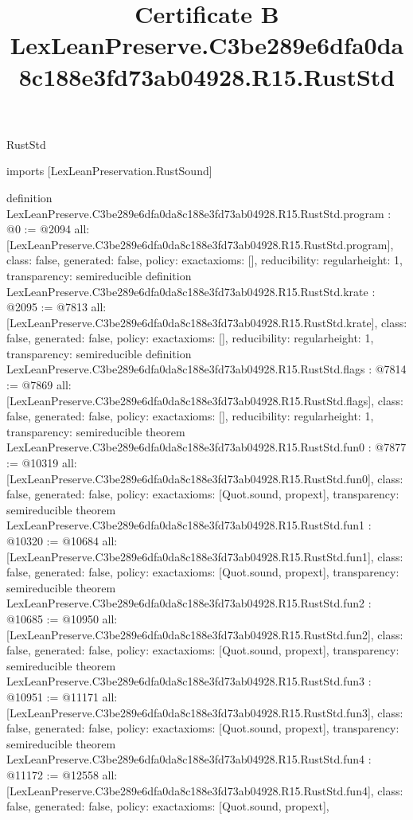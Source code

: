 \begin{lexlean}{RustStd}
\title{Certificate B LexLeanPreserve.C3be289e6dfa0da8c188e3fd73ab04928.R15.RustStd}
\begin{coremodule}
imports [LexLeanPreservation.RustSound]

definition LexLeanPreserve.C3be289e6dfa0da8c188e3fd73ab04928.R15.RustStd.program : @0 := @2094 {
  all: [LexLeanPreserve.C3be289e6dfa0da8c188e3fd73ab04928.R15.RustStd.program],
  class: false,
  generated: false,
  policy: exact{axioms: []},
  reducibility: regular{height: 1},
  transparency: semireducible
}
definition LexLeanPreserve.C3be289e6dfa0da8c188e3fd73ab04928.R15.RustStd.krate : @2095 := @7813 {
  all: [LexLeanPreserve.C3be289e6dfa0da8c188e3fd73ab04928.R15.RustStd.krate],
  class: false,
  generated: false,
  policy: exact{axioms: []},
  reducibility: regular{height: 1},
  transparency: semireducible
}
definition LexLeanPreserve.C3be289e6dfa0da8c188e3fd73ab04928.R15.RustStd.flags : @7814 := @7869 {
  all: [LexLeanPreserve.C3be289e6dfa0da8c188e3fd73ab04928.R15.RustStd.flags],
  class: false,
  generated: false,
  policy: exact{axioms: []},
  reducibility: regular{height: 1},
  transparency: semireducible
}
theorem LexLeanPreserve.C3be289e6dfa0da8c188e3fd73ab04928.R15.RustStd.fun0 : @7877 := @10319 {
  all: [LexLeanPreserve.C3be289e6dfa0da8c188e3fd73ab04928.R15.RustStd.fun0],
  class: false,
  generated: false,
  policy: exact{axioms: [Quot.sound, propext]},
  transparency: semireducible
}
theorem LexLeanPreserve.C3be289e6dfa0da8c188e3fd73ab04928.R15.RustStd.fun1 : @10320 := @10684 {
  all: [LexLeanPreserve.C3be289e6dfa0da8c188e3fd73ab04928.R15.RustStd.fun1],
  class: false,
  generated: false,
  policy: exact{axioms: [Quot.sound, propext]},
  transparency: semireducible
}
theorem LexLeanPreserve.C3be289e6dfa0da8c188e3fd73ab04928.R15.RustStd.fun2 : @10685 := @10950 {
  all: [LexLeanPreserve.C3be289e6dfa0da8c188e3fd73ab04928.R15.RustStd.fun2],
  class: false,
  generated: false,
  policy: exact{axioms: [Quot.sound, propext]},
  transparency: semireducible
}
theorem LexLeanPreserve.C3be289e6dfa0da8c188e3fd73ab04928.R15.RustStd.fun3 : @10951 := @11171 {
  all: [LexLeanPreserve.C3be289e6dfa0da8c188e3fd73ab04928.R15.RustStd.fun3],
  class: false,
  generated: false,
  policy: exact{axioms: [Quot.sound, propext]},
  transparency: semireducible
}
theorem LexLeanPreserve.C3be289e6dfa0da8c188e3fd73ab04928.R15.RustStd.fun4 : @11172 := @12558 {
  all: [LexLeanPreserve.C3be289e6dfa0da8c188e3fd73ab04928.R15.RustStd.fun4],
  class: false,
  generated: false,
  policy: exact{axioms: [Quot.sound, propext]},
}
\end{coremodule}
\end{lexlean}
